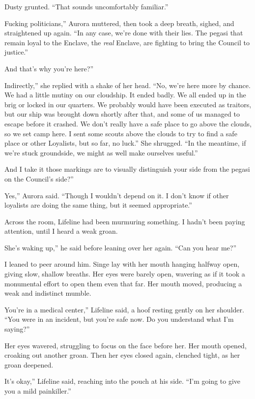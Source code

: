 Dusty grunted. “That sounds uncomfortably familiar.”

\leavevmode{}Fucking politicians,” Aurora muttered, then took a deep breath, sighed, and straightened up again. “In any case, we’re done with their lies. The pegasi that remain loyal to the Enclave, the \textit{real} Enclave, are fighting to bring the Council to justice.”

\leavevmode{}And that’s why you’re here?”

\leavevmode{}Indirectly,” she replied with a shake of her head. “No, we’re here more by chance. We had a little mutiny on our cloudship. It ended badly. We all ended up in the brig or locked in our quarters. We probably would have been executed as traitors, but our ship was brought down shortly after that, and some of us managed to escape before it crashed. We don’t really have a safe place to go above the clouds, so we set camp here. I sent some scouts above the clouds to try to find a safe place or other Loyalists, but so far, no luck.” She shrugged. “In the meantime, if we’re stuck groundside, we might as well make ourselves useful.”

\leavevmode{}And I take it those markings are to visually distinguish your side from the pegasi on the Council’s side?”

\leavevmode{}Yes,” Aurora said. “Though I wouldn’t depend on it. I don’t know if other loyalists are doing the same thing, but it seemed appropriate.”

Across the room, Lifeline had been murmuring something. I hadn’t been paying attention, until I heard a weak groan.

\leavevmode{}She’s waking up,” he said before leaning over her again. “Can you hear me?”

I leaned to peer around him. Singe lay with her mouth hanging halfway open, giving slow, shallow breaths. Her eyes were barely open, wavering as if it took a monumental effort to open them even that far. Her mouth moved, producing a weak and indistinct mumble.

\leavevmode{}You’re in a medical center,” Lifeline said, a hoof resting gently on her shoulder. “You were in an incident, but you’re safe now. Do you understand what I’m saying?”

Her eyes wavered, struggling to focus on the face before her. Her mouth opened, croaking out another groan. Then her eyes closed again, clenched tight, as her groan deepened.

\leavevmode{}It’s okay,” Lifeline said, reaching into the pouch at his side. “I’m going to give you a mild painkiller.”

